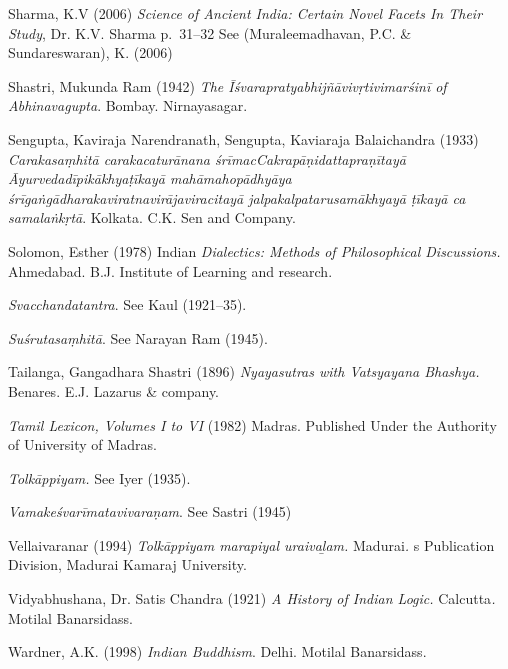 \begin{thebibliography}{99}
  Sharma, K.V (2006) \textit{Science of Ancient India: Certain Novel Facets In Their Study}, Dr. K.V. Sharma p.~31--32 See (Muraleemadhavan, P.C. \& Sundareswaran), K. (2006)

  Shastri, Mukunda Ram (1942) \textit{The Īśvarapratyabhijñāvivṛtivimarśinī of Abhinavagupta}. Bombay. Nirnayasagar.

  Sengupta, Kaviraja Narendranath, Sengupta, Kaviaraja Balaichandra (1933) \textit{Carakasaṃhitā carakacaturānana śrīmacCakrapāṇidattapraṇītayā Āyurvedadīpikākhyaṭīkayā mahāmahopādhyāya śrīgaṅgādharakaviratnavirājaviracitayā jalpakalpatarusamākhyayā ṭīkayā ca samalaṅkṛtā}. Kolkata. C.K. Sen and Company.

  Solomon, Esther (1978) Indian \textit{Dialectics: Methods of Philosophical Discussions.} Ahmedabad. B.J. Institute of Learning and research.

  \textit{Svacchandatantra}. See Kaul (1921--35).

  \textit{Suśrutasaṃhitā}. See Narayan Ram (1945).

  Tailanga, Gangadhara Shastri (1896) \textit{Nyayasutras with Vatsyayana Bhashya.} Benares. E.J. Lazarus \& company.

  \textit{Tamil Lexicon, Volumes I to VI} (1982) Madras. Published Under the Authority of University of Madras.

  \textit{Tolkāppiyam.} See Iyer (1935).

  \textit{Vamakeśvarīmatavivaraṇam}. See Sastri (1945)

  Vellaivaranar (1994) \textit{Tolkāppiyam marapiyal uraivaḻam.} Madurai\textit{.} s Publication Division, Madurai Kamaraj University.

  Vidyabhushana, Dr. Satis Chandra (1921) \textit{A History of Indian Logic.} Calcutta\textit{.} Motilal Banarsidass.

  Wardner, A.K. (1998) \textit{Indian Buddhism}. Delhi. Motilal Banarsidass.

 \end{thebibliography}

